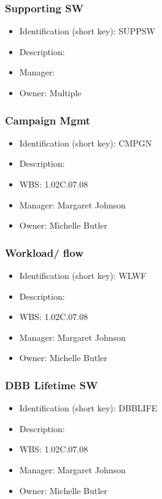 \subsubsection{Supporting SW}\label{sect:SUPPSW}
\begin{itemize}
\item Identification (short key): SUPPSW
\item Description: 
\item Manager: 
\item Owner: Multiple
\end{itemize}

\subsubsection{Campaign Mgmt}\label{sect:CMPGN}
\begin{itemize}
\item Identification (short key): CMPGN
\item Description: 
\item WBS: 1.02C.07.08
\item Manager: Margaret Johnson
\item Owner: Michelle Butler
\end{itemize}

\subsubsection{Workload/ flow}\label{sect:WLWF}
\begin{itemize}
\item Identification (short key): WLWF
\item Description: 
\item WBS: 1.02C.07.08
\item Manager: Margaret Johnson
\item Owner: Michelle Butler
\end{itemize}

\subsubsection{DBB Lifetime SW}\label{sect:DBBLIFE}
\begin{itemize}
\item Identification (short key): DBBLIFE
\item Description: 
\item WBS: 1.02C.07.08
\item Manager: Margaret Johnson
\item Owner: Michelle Butler
\end{itemize}

